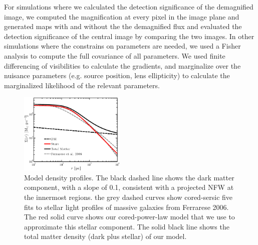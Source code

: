 \documentclass[chicago]{emulateapj}
\begin{document}
For simulations where we calculated the detection significance of the demagnified image, we computed the magnification at every pixel in the image plane and generated maps with and without the the demagnified flux and evaluated the detection significance of the central image by comparing the two images. In other simulations where the constrains on parameters are needed, we used a Fisher analysis to compute the full covariance of all parameters. 
We used finite differencing of visibilities to calculate the gradients, and marginalize over the nuisance parameters (e.g. source position, lens ellipticity) to calculate the marginalized likelihood of the relevant parameters. 

\begin{figure}
\begin{center}
\centering
\includegraphics[trim= 0 0 5 6, clip, width=0.45\textwidth]{figures/f_01.eps}
\centering
\end{center}
\caption{ Model density profiles. The black dashed line shows the dark matter component, with a slope of 0.1, consistent with a projected NFW at the innermost regions. the grey dashed curves show cored-sersic five fits to stellar light profiles of massive galaxies from Ferrarese 2006. The red solid curve shows our cored-power-law model that we use to approximate this stellar component. The solid black line shows the total matter density (dark plus stellar) of our model. 
\label{fig2}}
\end{figure}

\end{document}
